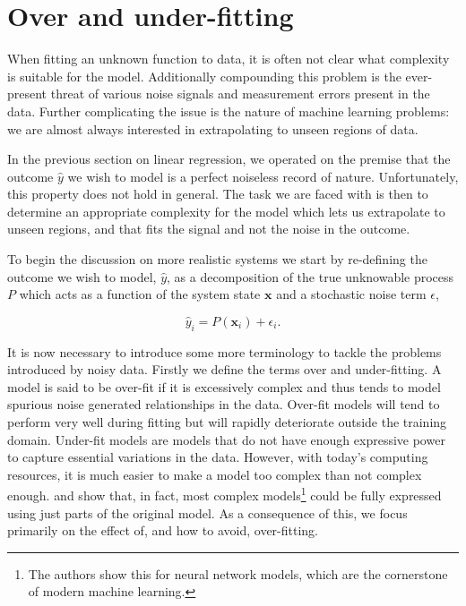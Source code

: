\section{Over and under-fitting}\label{sec:fitting}

When fitting an unknown function to data, it is often not clear what complexity is suitable for the model. Additionally compounding this problem is the ever-present threat of various noise signals and measurement errors present in the data. Further complicating the issue is the nature of machine learning problems: we are almost always interested in extrapolating to unseen regions of data. 

In the previous section on linear regression, we operated on the premise that the outcome $\hat{y}$ we wish to model is a perfect noiseless record of nature. Unfortunately, this property does not hold in general. The task we are faced with is then to determine an appropriate complexity for the model which lets us extrapolate to unseen regions, and that fits the signal and not the noise in the outcome. 

To begin the discussion on more realistic systems we start by re-defining the outcome we wish to model, $\hat{y}$, as a decomposition of the true unknowable process $P$ which acts as a function of the system state $\boldsymbol{x}$ and a stochastic noise term $\epsilon$, 

\begin{equation}\label{eq:target}
\hat{y}_i = P(\boldsymbol{x}_i) + \epsilon_i.
\end{equation}

\noindent It is now necessary to introduce some more terminology to tackle the problems introduced by noisy data. Firstly we define the terms over and under-fitting. A model is said to be over-fit if it is excessively complex and thus tends to model spurious noise generated relationships in the data. Over-fit models will tend to perform very well during fitting but will rapidly deteriorate outside the training  domain. Under-fit models are models that do not have enough expressive power to capture essential variations in the data.  However, with today's computing resources, it is much easier to make a model too complex than not complex enough. \citet{Frankle2019} and \citet{Frankle2018} show that, in fact, most complex models\footnote{The authors show this for neural network models, which are the cornerstone of modern machine learning.} could be fully expressed using just parts of the original model. As a consequence of this, we focus primarily on the effect of, and how to avoid, over-fitting.

